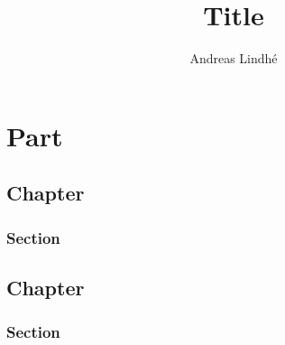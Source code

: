 \documentclass[a4paper]{report}
\title{Title}
\author{Andreas Lindhé} %
\begin{document}
\maketitle

\tableofcontents

\abstract

\lipsum[1]

\part{Part}

\chapter{Chapter}

\section{Section} %

%

\lipsum[1-2]


\appendix 

\chapter{Chapter}

\section{Section}

%

\lipsum[1-2]
\end{document}
